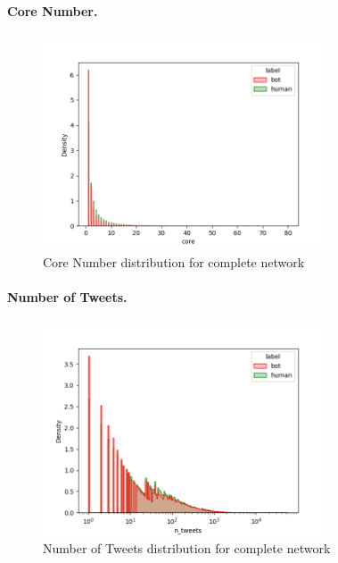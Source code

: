 \documentclass[12pt, a4paper]{article}
\begin{document}
		\paragraph{Core Number.}
		\mbox{}
		\begin{figure}[H]
        	\centering
            \includegraphics[width=0.75\textwidth]{results/complete_core.png}
            \caption{Core Number distribution for complete network}
        \end{figure}
        \newpage
        \paragraph{Number of Tweets.}
        \mbox{}
        \begin{figure}[H]
        	\centering
        	\includegraphics[width=0.75\textwidth]{results/complete_n_tweets.png}
            \caption{Number of Tweets distribution for complete network}
      	\end{figure}
\end{document}
